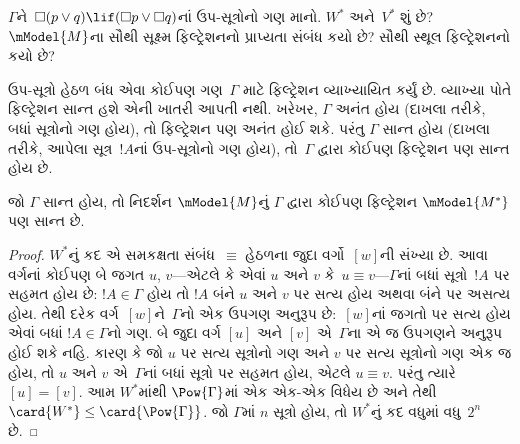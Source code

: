 \begin{prob}
  $\Gamma$ને~$\Box(p \lor q) \lif (\Box p \lor \Box q)$નાં
  ઉપ-સૂત્રોનો ગણ માનો. $W^*$ અને~$V^*$ શું છે?
  $\mModel{M}$ના સૌથી સૂક્ષ્મ ફિલ્ટ્રેશનનો પ્રાપ્યતા સંબંધ કયો છે?
  સૌથી સ્થૂલ ફિલ્ટ્રેશનનો કયો છે?
\end{prob}
\endgroup

\begingroup
\makeatletter{}\makeatother


\label{guunit:OLP-0455}


ઉપ-સૂત્રો હેઠળ બંધ એવા કોઈપણ ગણ~$\Gamma$ માટે ફિલ્ટ્રેશન
વ્યાખ્યાયિત કર્યું છે. વ્યાખ્યા પોતે ફિલ્ટ્રેશન સાન્ત હશે એની ખાતરી
આપતી નથી. ખરેખર, $\Gamma$ અનંત હોય (દાખલા તરીકે, બધાં
સૂત્રોનો ગણ હોય), તો ફિલ્ટ્રેશન પણ અનંત હોઈ શકે. પરંતુ
$\Gamma$ સાન્ત હોય (દાખલા તરીકે, આપેલા સૂત્ર~$!A$નાં
ઉપ-સૂત્રોનો ગણ હોય), તો~$\Gamma$ દ્વારા કોઈપણ ફિલ્ટ્રેશન
પણ સાન્ત હોય છે.

\begin{prop}
  જો $\Gamma$ સાન્ત હોય, તો નિદર્શન $\mModel{M}$નું $\Gamma$ દ્વારા
  કોઈપણ ફિલ્ટ્રેશન $\mModel{M^*}$ પણ સાન્ત છે.
\end{prop}

\begin{proof}
  $W^*$નું કદ એ સમકક્ષતા સંબંધ~$\equiv$ હેઠળના જુદા વર્ગો~$[w]$ની
  સંખ્યા છે. આવા વર્ગનાં કોઈપણ બે જગત $u$, $v$—એટલે કે એવાં
  $u$ અને $v$ કે~$u \equiv v$—$\Gamma$નાં બધાં
  સૂત્રો~$!A$ પર સહમત હોય છે: $!A \in \Gamma$ હોય તો $!A$
  બંને $u$ અને $v$ પર સત્ય હોય અથવા બંને પર અસત્ય હોય. તેથી દરેક
  વર્ગ~$[w]$ને~$\Gamma$નો એક ઉપગણ અનુરૂપ છે:~$[w]$નાં જગતો પર
  સત્ય હોય એવાં બધાં $!A \in \Gamma$નો ગણ. બે જુદા વર્ગ
  $[u]$ અને $[v]$ એ~$\Gamma$ના એ જ ઉપગણને અનુરૂપ હોઈ શકે નહિ. કારણ કે જો
  $u$ પર સત્ય સૂત્રોનો ગણ અને $v$ પર સત્ય સૂત્રોનો
  ગણ એક જ હોય, તો $u$ અને $v$ એ~$\Gamma$નાં બધાં સૂત્રો પર
  સહમત હોય, એટલે $u \equiv v$. પરંતુ ત્યારે $[u] = [v]$.
  આમ $W^*$માંથી $\Pow{\Gamma}$માં એક એક-એક વિધેય છે અને
  તેથી $\card{W^*} \le \card{\Pow{\Gamma}}$. જો $\Gamma$માં $n$
  સૂત્રો હોય, તો $W^*$નું કદ વધુમાં વધુ~$2^n$ છે.
\end{proof}
\endgroup

\begingroup
\makeatletter{}\makeatother


\label{guunit:OLP-0456}


